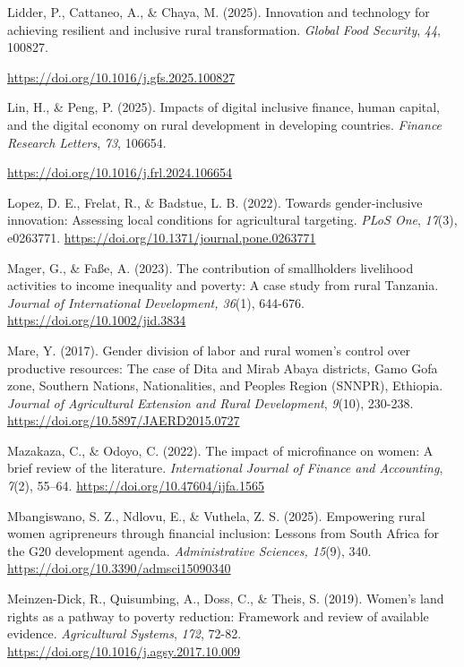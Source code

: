 ﻿\documentclass[sn-mathphys-num]{sn-jnl}
\newcommand{\hl}[1]{#1}
\begin{document}
\hl{Lidder, P., Cattaneo, A., \& Chaya, M. (2025). Innovation and
technology for achieving resilient and inclusive rural transformation.
\emph{Global Food Security}, \emph{44}, 100827.}

\href{https://doi.org/10.1016/j.gfs.2025.100827}{\hl{https://doi.org/10.1016/j.gfs.2025.100827}}

\hl{Lin, H., \& Peng, P. (2025). Impacts of digital inclusive finance,
human capital, and the digital economy on rural development in
developing countries. \emph{Finance Research Letters}, \emph{73},
106654.}

\href{https://doi.org/10.1016/j.frl.2024.106654}{\hl{https://doi.org/10.1016/j.frl.2024.106654}}

\hl{Lopez, D. E., Frelat, R., \& Badstue, L. B. (2022). Towards
gender-inclusive innovation: Assessing local conditions for agricultural
targeting. \emph{PLoS One}, \emph{17}(3), e0263771.}
\href{https://doi.org/10.1371/journal.pone.0263771}{\hl{https://doi.org/10.1371/journal.pone.0263771}}

\hl{Mager, G., \& Faße, A. (2023). The contribution of
smallholders\textquotesingle{} livelihood activities to income
inequality and poverty: A case study from rural Tanzania. \emph{Journal
of International Development, 36}(1), 644-676.}
\href{https://doi.org/10.1002\%2Fjid.3834}{\hl{https://doi.org/10.1002/jid.3834}}

\hl{Mare, Y. (2017). Gender division of labor and rural women's control
over productive resources: The case of Dita and Mirab Abaya districts,
Gamo Gofa zone, Southern Nations, Nationalities, and Peoples Region
(SNNPR), Ethiopia. \emph{Journal of Agricultural Extension and Rural
Development}, \emph{9}(10), 230-238.}
\href{https://doi.org/10.5897/JAERD2015.0727}{\hl{https://doi.org/10.5897/JAERD2015.0727}}

\hl{Mazakaza, C., \& Odoyo, C. (2022). The impact of microfinance on
women: A brief review of the literature. \emph{International Journal of
Finance and Accounting}, \emph{7}(2), 55--64.}
\href{https://doi.org/10.47604/ijfa.1565}{\hl{https://doi.org/10.47604/ijfa.1565}}

\hl{Mbangiswano, S. Z., Ndlovu, E., \& Vuthela, Z. S. (2025). Empowering
rural women agripreneurs through financial inclusion: Lessons from South
Africa for the G20 development agenda. \emph{Administrative Sciences,
15}(9), 340.}
\href{https://doi.org/10.3390/admsci15090340}{\hl{https://doi.org/10.3390/admsci15090340}}

\hl{Meinzen-Dick, R., Quisumbing, A., Doss, C., \& Theis, S. (2019).
Women's land rights as a pathway to poverty reduction: Framework and
review of available evidence. \emph{Agricultural Systems}, \emph{172},
72-82.}
\href{https://doi.org/10.1016/j.agsy.2017.10.009}{\hl{https://doi.org/10.1016/j.agsy.2017.10.009}}
\end{document}

